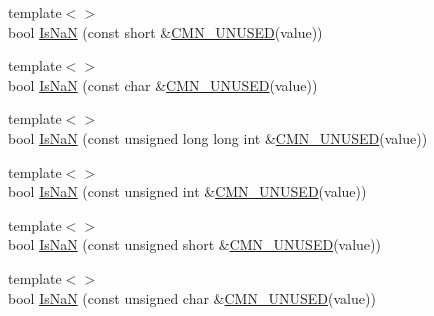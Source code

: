 \begin{DoxyCompactItemize}
\item 
{\footnotesize template$<$$>$ }\\bool \hyperlink{classcmn_type_traits_a9b8bd8d268e509d56d4310361a8abfc9}{Is\+Na\+N} (const short \&\hyperlink{cmn_portability_8h_a021894e2626935fa2305434b1e893ff6}{C\+M\+N\+\_\+\+U\+N\+U\+S\+E\+D}(value))
\item 
{\footnotesize template$<$$>$ }\\bool \hyperlink{classcmn_type_traits_a9fd505fec8762050be529c958c62abfc}{Is\+Na\+N} (const char \&\hyperlink{cmn_portability_8h_a021894e2626935fa2305434b1e893ff6}{C\+M\+N\+\_\+\+U\+N\+U\+S\+E\+D}(value))
\item 
{\footnotesize template$<$$>$ }\\bool \hyperlink{classcmn_type_traits_a8f50cc32a683d36bf204b28d483d6daa}{Is\+Na\+N} (const unsigned long long int \&\hyperlink{cmn_portability_8h_a021894e2626935fa2305434b1e893ff6}{C\+M\+N\+\_\+\+U\+N\+U\+S\+E\+D}(value))
\item 
{\footnotesize template$<$$>$ }\\bool \hyperlink{classcmn_type_traits_a9d3d8e5e2cd2bcc7aec2da903951f270}{Is\+Na\+N} (const unsigned int \&\hyperlink{cmn_portability_8h_a021894e2626935fa2305434b1e893ff6}{C\+M\+N\+\_\+\+U\+N\+U\+S\+E\+D}(value))
\item 
{\footnotesize template$<$$>$ }\\bool \hyperlink{classcmn_type_traits_a78c8f5a476ef1f7d8552afd51fe96884}{Is\+Na\+N} (const unsigned short \&\hyperlink{cmn_portability_8h_a021894e2626935fa2305434b1e893ff6}{C\+M\+N\+\_\+\+U\+N\+U\+S\+E\+D}(value))
\item 
{\footnotesize template$<$$>$ }\\bool \hyperlink{classcmn_type_traits_abde8ab1f9a8f182fd1e0c0f7441c9e36}{Is\+Na\+N} (const unsigned char \&\hyperlink{cmn_portability_8h_a021894e2626935fa2305434b1e893ff6}{C\+M\+N\+\_\+\+U\+N\+U\+S\+E\+D}(value))
\end{DoxyCompactItemize}
